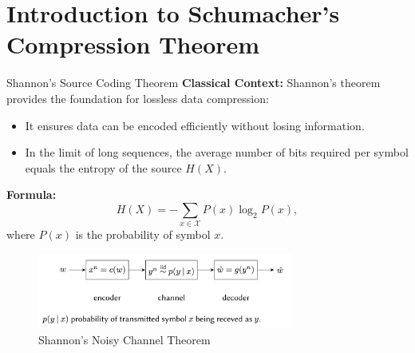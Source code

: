 \section{Introduction to Schumacher's Compression Theorem}

\begin{frame}{Shannon's Source Coding Theorem}
    \textbf{Classical Context:} Shannon's theorem provides the foundation for lossless data compression:
    \begin{itemize}
        \item It ensures data can be encoded efficiently without losing information.
        \item In the limit of long sequences, the average number of bits required per symbol equals the entropy of the source \( H(X) \).
    \end{itemize}
    \textbf{Formula:}
    \[
    H(X) = -\sum_{x \in \mathcal{X}} P(x) \log_2 P(x),
    \]
    where \( P(x) \) is the probability of symbol \( x \).
    \begin{figure}[h]
        \centering
        \includegraphics[width=0.75\textwidth]{figures/shannon_pic.png}
        \caption{Shannon's Noisy Channel Theorem \cite{jahooShannonsNoisy}}
    \end{figure}
\end{frame}

